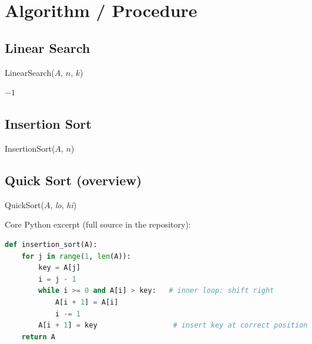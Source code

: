 \documentclass[11pt,a4paper]{article}
\begin{document}
\section{Algorithm / Procedure}

\subsection{Linear Search}
\begin{algorithm}[H]
\caption{LinearSearch($A$, $n$, $k$)}
\Return $-1$\;
\end{algorithm}

\subsection{Insertion Sort}
\begin{algorithm}[H]
\caption{InsertionSort($A$, $n$)}
\end{algorithm}

\subsection{Quick Sort (overview)}
\begin{algorithm}[H]
\caption{QuickSort($A$, \textit{lo}, \textit{hi})}
\end{algorithm}

Core Python excerpt (full source in the repository):
\begin{lstlisting}[language=Python]
def insertion_sort(A):
    for j in range(1, len(A)):
        key = A[j]
        i = j - 1
        while i >= 0 and A[i] > key:   # inner loop: shift right
            A[i + 1] = A[i]
            i -= 1
        A[i + 1] = key                  # insert key at correct position
    return A
\end{lstlisting}
\end{document}
